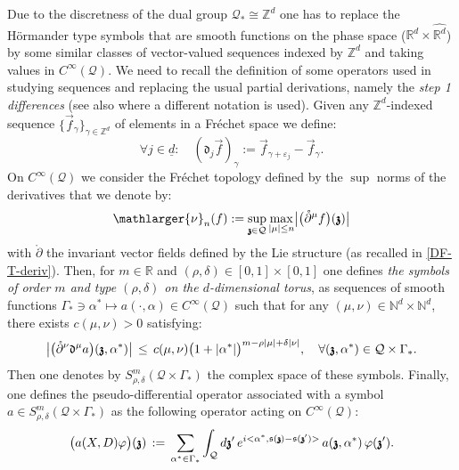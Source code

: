 \documentclass[12pt]{article}
\theoremstyle{definition}
\def\R{\mathbb{R}}
\def\Rd{\mathbb{R}^d}
\def\Zd{\mathbb{Z}^d}
\def\T{\mathcal{Q}}
\def\s{\mathfrak{s}}
\def\bz{\mathfrak{z}\hspace*{-4pt}\mathfrak{z}}
\def\dd{\mathfrak{d}}
\def\beq{\begin{equation}}
\def\eeq{\end{equation}}
\numberwithin{equation}{section}
\def\lnu{\mathlarger{\nu}}
\begin{document}
Due to the discretness of the dual group $\T_*\cong\Zd$ one has to replace the H\"{o}rmander type symbols that are smooth functions on the phase space ($\Rd\times\widehat{\Rd}$) by some similar classes of vector-valued sequences indexed by $\Zd$ and taking values in $C^\infty(\T)$. 
We need to recall the definition of some operators used in studying sequences and replacing the usual partial derivations, namely the \textit{step 1 differences} (see also \cite{RT-06, McL-91} where a different notation is used).  
Given any $\Zd$-indexed sequence $\{\vec{f}_{\gamma}\}_{\gamma\in\Zd}$ of elements  in a Fr\'{e}chet space we define:
\beq\label{F-B-1}
\forall{j}\in\underline{d}:\quad(\dd_j\vec{f})_\gamma:=\vec{f}_{\gamma+\varepsilon_j}-\vec{f}_{\gamma}.
\eeq 
On $C^\infty(\T)$ we consider the Fr\'{e}chet topology  defined by the $\sup$ norms of the derivatives that we denote by:
\beq
\lnu_n(f):=\underset{\bz\in\T}{\sup}\,\underset{|\mu|\leq{n}}{\max}\big|\big(\mathring{\partial}^\mu{f}\big)(\bz)\big|
\eeq
with $\mathring{\partial}$ the invariant vector fields defined by the Lie structure (as recalled in \eqref{DF-T-deriv}).
 Then, for $m\in\R$ and $(\rho,\delta)\in[0,1]\times[0,1]$ one defines \textit{the symbols of order $m$ and type $(\rho,\delta)$ on the $d$-dimensional torus}, as sequences of smooth functions $\Gamma_*\ni\alpha^*\mapsto{a}(\cdot,\alpha)\in{C}^\infty(\T)$ such that for any $(\mu,\nu)\in\mathbb{N}^d\times\mathbb{N}^d$, there exists ${c}(\mu,\nu)>0$ satisfying:
 \beq\label{F-3-3}
\big|\big(\mathring{\partial}^\nu\dd^\mu{a}\big)(\bz,\alpha^*)\big|\,\leq\,c(\mu,\nu)\big(1+|\alpha^*|\big)^{m-\rho|\mu|+\delta|\nu|},\quad\forall(\bz,\alpha^*)\in\T\times\Gamma_*.
 \eeq
 Then one denotes by $S^m_{\rho,\delta}(\T\times\Gamma_*)$ the complex space of these symbols. Finally, one defines the pseudo-differential operator associated with  a symbol $a\in{S}^m_{\rho,\delta}(\T\times\Gamma_*)$ as the following operator acting on ${C}^\infty(\T)$:
 \beq\label{F-3-4}
 \big(a(X,D)\varphi\big)(\bz)\,:=\,\underset{\alpha^*\in\Gamma_*}{\sum}\int_{\T}d\bz^\prime\,e^{i<\alpha^*,\s(\bz)-\s(\bz^\prime)>}\,a(\bz,\alpha^*)\,\varphi(\bz^\prime).
 \eeq
\end{document}
